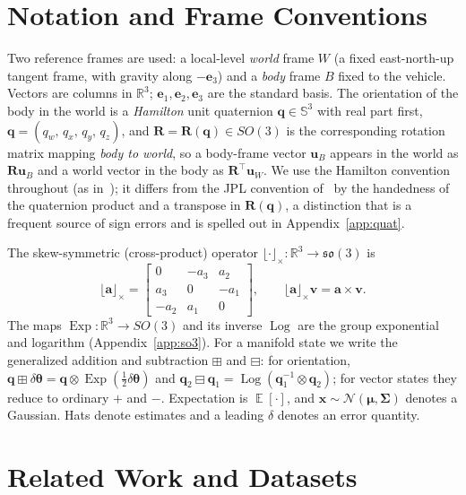 \documentclass[11pt]{article}
\newcommand{\R}{\mathbf{R}}
\newcommand{\bv}{\mathbf{v}}
\newcommand{\ba}{\mathbf{a}}
\newcommand{\be}{\mathbf{e}}
\newcommand{\bu}{\mathbf{u}}
\newcommand{\bq}{\mathbf{q}}
\newcommand{\bx}{\mathbf{x}}
\newcommand{\skewm}[1]{\lfloor #1 \rfloor_\times}
\newcommand{\dtheta}{\delta\bm{\theta}}
\newcommand{\real}{\mathbb{R}}
\DeclareMathOperator{\Exp}{Exp}
\DeclareMathOperator{\Log}{Log}
\DeclareMathOperator{\Ex}{\mathbb{E}}
\begin{document}
\section{Notation and Frame Conventions}
\label{sec:notation}

Two reference frames are used: a local-level \emph{world} frame $W$ (a fixed east-north-up tangent
frame, with gravity along $-\be_3$) and a \emph{body} frame $B$ fixed to the vehicle. Vectors are
columns in $\real^3$; $\be_1,\be_2,\be_3$ are the standard basis. The orientation of the body in the
world is a \emph{Hamilton} unit quaternion $\bq\in\mathbb{S}^3$ with real part first,
$\bq=(q_w,\,q_x,\,q_y,\,q_z)$, and $\R=\R(\bq)\in SO(3)$ is the corresponding rotation matrix mapping
\emph{body to world}, so a body-frame vector $\bu_B$ appears in the world as $\R\bu_B$ and a world
vector in the body as $\R^\top\bu_W$. We use the Hamilton convention throughout (as
in~\cite{sola2017}); it differs from the JPL convention of~\cite{trawny2005} by the handedness of the
quaternion product and a transpose in $\R(\bq)$, a distinction that is a frequent source of sign errors
and is spelled out in Appendix~\ref{app:quat}.

The skew-symmetric (cross-product) operator $\skewm{\cdot}:\real^3\to\mathfrak{so}(3)$ is
\begin{equation}
  \skewm{\ba} =
  \begin{bmatrix} 0 & -a_3 & a_2 \\ a_3 & 0 & -a_1 \\ -a_2 & a_1 & 0 \end{bmatrix},
  \qquad \skewm{\ba}\bv = \ba\times\bv .
\end{equation}
The maps $\Exp:\real^3\to SO(3)$ and its inverse $\Log$ are the group exponential and logarithm
(Appendix~\ref{app:so3}). For a manifold state we write the generalized addition and subtraction
$\boxplus$ and $\boxminus$: for orientation, $\bq\boxplus\dtheta = \bq\otimes\Exp(\tfrac12\dtheta)$ and
$\bq_2\boxminus\bq_1 = \Log(\bq_1^{-1}\otimes\bq_2)$; for vector states they reduce to ordinary
$+$ and $-$. Expectation is $\Ex[\cdot]$, and $\bx\sim\mathcal N(\bm\mu,\bm\Sigma)$ denotes a Gaussian.
Hats denote estimates and a leading $\delta$ denotes an error quantity.

\section{Related Work and Datasets}
\label{sec:related}
\end{document}
